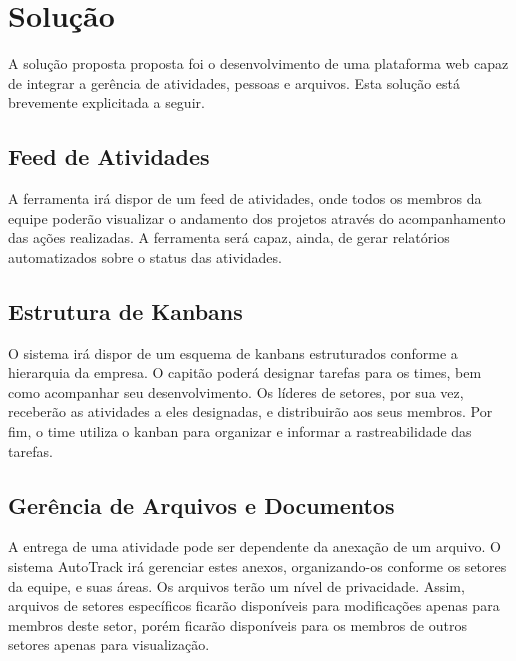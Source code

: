 \section{Solução}
A solução proposta proposta foi o desenvolvimento de uma plataforma web capaz de integrar a gerência de atividades,
pessoas e arquivos. Esta solução está brevemente explicitada a seguir.

\subsection{Feed de Atividades}
A ferramenta irá dispor de um feed de atividades, onde todos os membros da equipe poderão visualizar o andamento
 dos projetos através do acompanhamento das ações realizadas. A ferramenta será capaz, ainda, de gerar
  relatórios automatizados sobre o status das atividades.

\subsection{Estrutura de Kanbans}
O sistema irá dispor de um esquema de kanbans estruturados conforme a hierarquia da empresa. O capitão poderá designar tarefas para os times,
bem como acompanhar seu desenvolvimento. Os líderes de setores, por sua vez, receberão as atividades a eles designadas,
 e distribuirão aos seus membros. Por fim, o time utiliza o kanban para organizar e informar a rastreabilidade das tarefas.

\subsection{Gerência de Arquivos e Documentos}
A entrega de uma atividade pode ser dependente da anexação de um arquivo. O sistema AutoTrack irá
gerenciar estes anexos, organizando-os conforme os setores da equipe, e suas áreas. Os arquivos terão um nível de privacidade.
 Assim, arquivos de setores específicos ficarão disponíveis para modificações apenas para membros deste setor, porém
  ficarão disponíveis para os membros de outros setores apenas para visualização.
